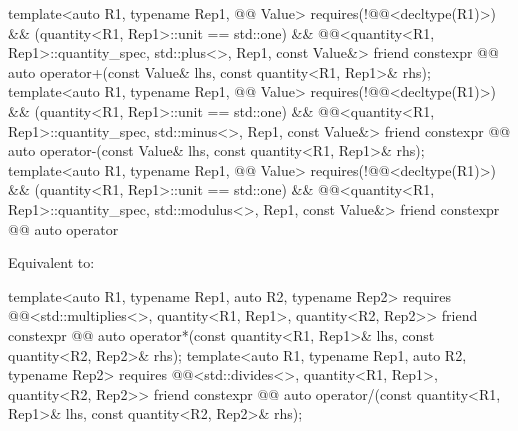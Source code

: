 \begin{itemdecl}
template<auto R1, typename Rep1, @@ Value>
  requires(!@@<decltype(R1)>) && (quantity<R1, Rep1>::unit == std::one) &&
          @@<quantity<R1, Rep1>::quantity_spec, std::plus<>, Rep1, const Value&>
friend constexpr @@ auto operator+(const Value& lhs, const quantity<R1, Rep1>& rhs);
template<auto R1, typename Rep1, @@ Value>
  requires(!@@<decltype(R1)>) && (quantity<R1, Rep1>::unit == std::one) &&
          @@<quantity<R1, Rep1>::quantity_spec, std::minus<>, Rep1, const Value&>
friend constexpr @@ auto operator-(const Value& lhs, const quantity<R1, Rep1>& rhs);
template<auto R1, typename Rep1, @@ Value>
  requires(!@@<decltype(R1)>) && (quantity<R1, Rep1>::unit == std::one) &&
          @@<quantity<R1, Rep1>::quantity_spec, std::modulus<>, Rep1, const Value&>
friend constexpr @@ auto operator%
\end{itemdecl}

\begin{itemdescr}
\pnum
\effects
Equivalent to:
\end{itemdescr}

\begin{itemdecl}
template<auto R1, typename Rep1, auto R2, typename Rep2>
  requires @@<std::multiplies<>, quantity<R1, Rep1>, quantity<R2, Rep2>>
friend constexpr @@ auto operator*(const quantity<R1, Rep1>& lhs,
                                               const quantity<R2, Rep2>& rhs);
template<auto R1, typename Rep1, auto R2, typename Rep2>
  requires @@<std::divides<>, quantity<R1, Rep1>, quantity<R2, Rep2>>
friend constexpr @@ auto operator/(const quantity<R1, Rep1>& lhs,
                                               const quantity<R2, Rep2>& rhs);
\end{itemdecl}

